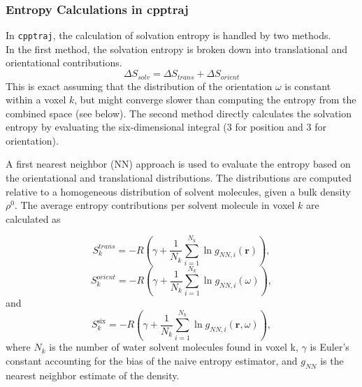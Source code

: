 \documentclass[9pt,tutorial]{livecoms}
\newcommand{\software}{\texttt}
\begin{document}
\subsubsection{Entropy Calculations in cpptraj}
In \software{cpptraj}, the calculation of solvation entropy is handled by two methods.\\
In the first method, the solvation entropy is broken down into translational and orientational contributions.
\begin{equation}
\Delta S_\textit{solv} = \Delta S_\textit{trans} + \Delta S_\textit{orient}
\end{equation}
This is exact assuming that the distribution of the orientation $\omega$ is constant within a voxel $k$, but might converge slower than computing the entropy from the combined space (see below).
The second method directly calculates the solvation entropy by evaluating the six-dimensional integral (3 for position and 3 for orientation).

A first nearest neighbor (NN) approach is used to evaluate the entropy based on the orientational and translational distributions.
The distributions are computed relative to a homogeneous distribution of solvent molecules, given a bulk density $\rho^0$.
The average entropy contributions per solvent molecule in voxel $k$ are calculated as

\begin{equation}
	S_{k}^\textit{trans} = -R \left( \gamma + \frac{1}{N_\textit{k}} \sum _{i=1}^{N_k} \ln g_{NN, \textit{i}}(\textbf{r}) \right),
\end{equation}
\begin{equation}
S_{k}^\textit{orient} = -R \left( \gamma + \frac{1}{N_k} \sum _{i=1}^{N_k} \ln g_{NN, i}(\omega) \right)
,
\end{equation}
and
\begin{equation}
S_\textit{k}^\text{six} = -R \left( \gamma + \frac{1}{N_\textit{k}} \sum _{i=1}^{N_k} \ln g_{NN, \textit{i}}(\textbf{r},\omega) \right),
\end{equation}
where $N_\textit{k}$ is the number of water solvent molecules found in voxel k, $\gamma$ is Euler's constant accounting for the bias of the naive entropy estimator, and $g_\textit{NN}$ is the nearest neighbor estimate of the density.
\end{document}
